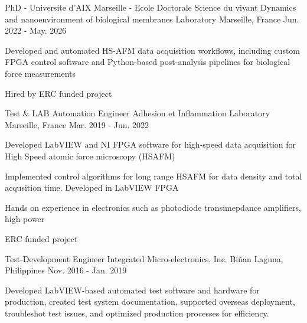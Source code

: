 
\begin{cventries}
  \cventry
  {PhD - Universite d’AIX Marseille - Ecole Doctorale Science du vivant }
  {Dynamics and nanoenvironment of biological membranes  Laboratory}
  {Marseille, France}
  {Jun. 2022 - May. 2026}
  {
    \begin{cvitems}
      \item {Developed and automated HS-AFM data acquisition workflows, including custom FPGA control software and Python-based post-analysis pipelines for biological force measurements}
      \item {Hired by ERC funded project }
    \end{cvitems}
    \vspace{1em}
  }

  \cventry
  {Test \& LAB Automation Engineer}
  {Adhesion et Inflammation  Laboratory}
  {Marseille, France}
  {Mar. 2019 - Jun. 2022}
  {
    \begin{cvitems}
      \item{Developed LabVIEW and NI FPGA software for high-speed data acquisition for High Speed atomic force microscopy (HSAFM)}
      \item {Implemented control algorithms for long range HSAFM for data density and total acqusition time. Developed in LabVIEW FPGA}
      \item {Hands on experience in electronics such as photodiode transimepdance amplifiers, high power }
      \item {ERC funded project }
    \end{cvitems}
    \vspace{1em}
  }

  \cventry
  {Test-Development Engineer}
  {Integrated Micro-electronics, Inc. }
  {Biñan Laguna, Philippines}
  {Nov. 2016 - Jan. 2019}
  {
    \begin{cvitems}
      \item{Developed LabVIEW-based automated test software and hardware for production, created test system documentation, supported overseas deployment, troubleshot test issues, and optimized production processes for efficiency.}
    \end{cvitems}
    \vspace{1em}
  }


\end{cventries}
